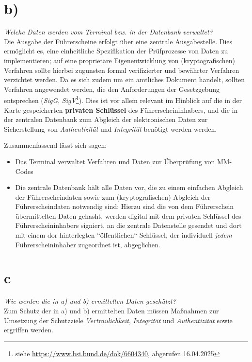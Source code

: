 \section{b)}

\textit{Welche Daten werden vom Terminal bzw. in der Datenbank verwaltet?}\\

\noindent
Die Ausgabe der Führerscheine erfolgt über eine zentrale Ausgabestelle.
Dies ermöglicht es, eine einheitliche Spezifikation der Prüfprozesse von Daten zu implementieren; auf eine proprietäre Eigenentwicklung von (kryptografischen) Verfahren sollte hierbei zugunsten formal verifizierter und bewährter Verfahren verzichtet werden.
Da es sich zudem um ein amtliches Dokument handelt, sollten Verfahren angewendet werden, die den Anforderungen der Gesetzgebung entsprechen (\textit{SigG}, \textit{SigV}\footnote{
siehe \url{https://www.bsi.bund.de/dok/6604340}, abgerufen 16.04.2025
}).
Dies ist vor allem relevant im Hinblick auf die in der Karte gespeicherten \textbf{privaten Schlüssel} des Führerscheininhabers, und die in der zentralen Datenbank zum Abgleich der elektronischen Daten zur Sicherstellung von \textit{Authentizität} und \textit{Integrität} benötigt werden werden.

Zusammenfassend lässt sich sagen:

\begin{itemize}
    \itemsep0.5em
    \item Das Terminal verwaltet Verfahren und Daten zur Überprüfung von MM-Codes
    \item Die zentrale Datenbank hält alle Daten vor, die zu einem einfachen Abgleich der Führerscheindaten sowie zum (kryptografischen) Abgleich der Führerscheindaten notwendig sind: Hierzu sind die von dem Führerschein übermittelten Daten gehasht, werden digital mit dem privaten Schlüssel des Führerscheininhabers signiert, an die zentrale Datenstelle gesendet und dort mit einem dor hinterlegten ``öffentlichen`` Schlüssel, der individuell \textit{jedem} Führerscheininhaber zugeordnet ist, abgeglichen.
\end{itemize}


\section{c}

\textit{Wie werden die in a) und b) ermittelten Daten geschützt?}\\

\noindent
Zum Schutz der in a) und b) ermittelten Daten müssen Maßnahmen zur Umsetzung der Schutzziele \textit{Vertraulichkeit}, \textit{Integrität} und \textit{Authentizität} sowie  ergriffen werden.\\

